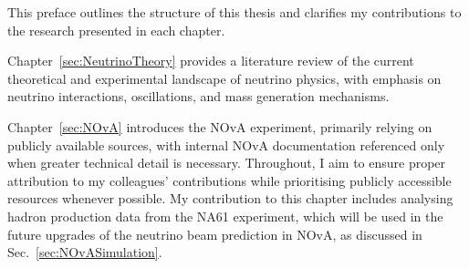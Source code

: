 \label{sec:Preface}

This preface outlines the structure of this thesis and clarifies my contributions to the research presented in each chapter.


Chapter~\ref{sec:NeutrinoTheory} provides a literature review of the current theoretical and experimental landscape of neutrino physics, with emphasis on neutrino interactions, oscillations, and mass generation mechanisms.

Chapter~\ref{sec:NOvA} introduces the NOvA experiment, primarily relying on publicly available sources, with internal NOvA documentation referenced only when greater technical detail is necessary. Throughout, I aim to ensure proper attribution to my colleagues' contributions while prioritising publicly accessible resources whenever possible. My contribution to this chapter includes analysing hadron production data from the NA61 experiment, which will be used in the future upgrades of the neutrino beam prediction in NOvA, as discussed in Sec.~\ref{sec:NOvASimulation}.%

